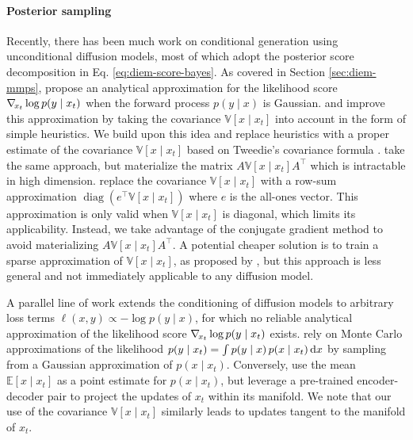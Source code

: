 \paragraph{Posterior sampling} Recently, there has been much work on conditional generation using unconditional diffusion models, most of which adopt the posterior score decomposition in Eq. \eqref{eq:diem-score-bayes}. As covered in Section \ref{sec:diem-mmps}, \textcite{chung2023diffusion} propose an analytical approximation for the likelihood score $\nabla_{\!{x_t}} \log p(y \mid x_t)$ when the forward process $p(y \mid x)$ is Gaussian. \textcite{song2023pseudoinverseguided} and \textcite{rozet2023scorebased} improve this approximation by taking the covariance $\mathbb{V}[x \mid x_t]$ into account in the form of simple heuristics. We build upon this idea and replace heuristics with a proper estimate of the covariance $\mathbb{V}[x \mid x_t]$ based on Tweedie's covariance formula \cite{tweedie1947functions, efron2011tweedies, kim2021noise2score, meng2021estimating}. \textcite{finzi2023userdefined} take the same approach, but materialize the matrix $A \mathbb{V}[x \mid x_t] A^\top$ which is intractable in high dimension. \textcite{boys2023tweedie} replace the covariance $\mathbb{V}[x \mid x_t]$ with a row-sum approximation $\operatorname{diag}( e^\top \mathbb{V}[x \mid x_t] )$ where $e$ is the all-ones vector. This approximation is only valid when $\mathbb{V}[x \mid x_t]$ is diagonal, which limits its applicability. Instead, we take advantage of the conjugate gradient method \cite{hestenes1952methods} to avoid materializing $A \mathbb{V}[x \mid x_t] A^\top$. A potential cheaper solution is to train a sparse approximation of $\mathbb{V}[x \mid x_t]$, as proposed by \textcite{peng2024improving}, but this approach is less general and not immediately applicable to any diffusion model.

A parallel line of work \cite{song2023lossguided, bansal2024universal, he2024manifold} extends the conditioning of diffusion models to arbitrary loss terms $\ell(x, y) \propto -\log p(y \mid x)$, for which no reliable analytical approximation of the likelihood score $\nabla_{\!{x_t}} \log p(y \mid x_t)$ exists. \textcite{song2023lossguided} rely on Monte Carlo approximations of the likelihood $p(y \mid x_t) = \int p(y \mid x) \, p(x \mid x_t) \operatorname{d}\!{x}$ by sampling from a Gaussian approximation of $p(x \mid x_t)$. Conversely, \textcite{he2024manifold} use the mean $\mathbb{E}[x \mid x_t]$ as a point estimate for $p(x \mid x_t)$, but leverage a pre-trained encoder-decoder pair to project the updates of $x_t$ within its manifold. We note that our use of the covariance $\mathbb{V}[x \mid x_t]$ similarly leads to updates tangent to the manifold of $x_t$.

